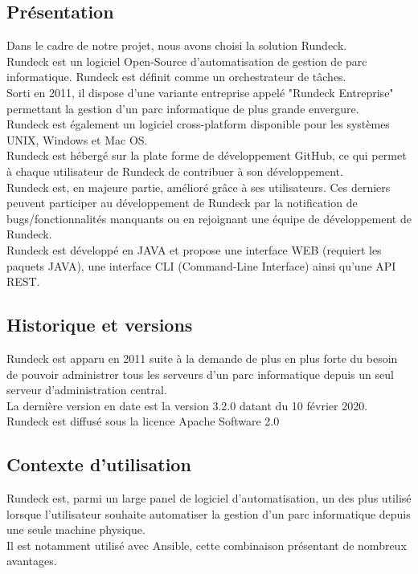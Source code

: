 \documentclass[12pt]{article}
\begin{document}
\subsection{Présentation}

Dans le cadre de notre projet, nous avons choisi la solution Rundeck.
\\
Rundeck est un logiciel Open-Source d'automatisation de gestion de parc informatique. Rundeck est définit comme un orchestrateur de tâches. 
\\
Sorti en 2011, il dispose d'une variante entreprise appelé "Rundeck Entreprise" permettant la gestion d'un parc informatique de plus grande envergure. 
\\
Rundeck est également un logiciel cross-platform disponible pour les systèmes UNIX, Windows et Mac OS. 
\\
Rundeck est hébergé sur la plate forme de développement GitHub, ce qui permet à chaque utilisateur de Rundeck de contribuer à son développement. 
\\
Rundeck est, en majeure partie, amélioré grâce à ses utilisateurs. Ces derniers peuvent participer au développement de Rundeck par la notification de bugs/fonctionnalités manquants ou en rejoignant une équipe de développement de Rundeck. 
\\
Rundeck est développé en JAVA et propose une interface WEB (requiert les paquets JAVA), une interface CLI (Command-Line Interface) ainsi qu'une API REST.

\subsection{Historique et versions}

Rundeck est apparu en 2011 suite à la demande de plus en plus forte du besoin de pouvoir administrer tous les serveurs d'un parc informatique depuis un seul serveur d'administration central.
\\
La dernière version en date est la version 3.2.0 datant du 10 février 2020.
\\
Rundeck est diffusé sous la licence Apache Software 2.0

\subsection{Contexte d'utilisation}

Rundeck est, parmi un large panel de logiciel d'automatisation, un des plus utilisé lorsque l'utilisateur souhaite automatiser la gestion d'un parc informatique depuis une seule machine physique.
\\
Il est notamment utilisé avec Ansible, cette combinaison présentant de nombreux avantages.
\end{document}
